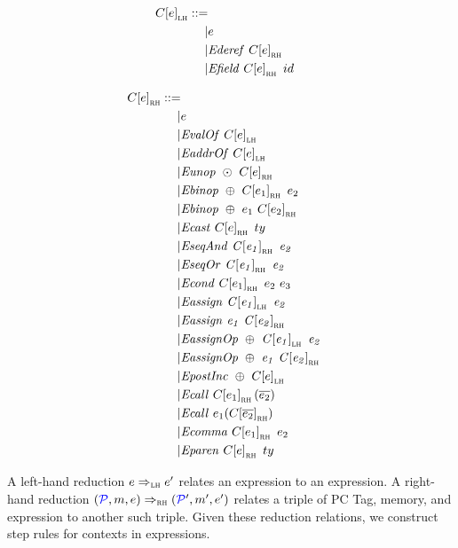 \documentclass{llncs}
\begin{document}
\[\begin{aligned}
\ctx{\expr}_\lh ::= \\
| & \expr & \\ %
| & \deref{\ctx{\expr}_\rh} \\ %
| & \field{\ctx{\expr}_\rh}{id} \\ %
\end{aligned}\]

\[\begin{aligned}
\ctx{\expr}_\rh ::= \\
| & \expr & \\ %
| & \valof{\ctx{\expr}_\lh} \\ %
| & \addrof{\ctx{\expr}_\lh} \\ %
| & \unop{\odot}{\ctx{\expr}_\rh} \\ %
| & \binop{\oplus}{\ctx{\expr_1}_\rh}{\expr_2} \\ %
| & \binop{\oplus}{\expr_1}{\ctx{\expr_2}_\rh} \\ %
| & \cast{\ctx{\expr}_\rh}{\type} \\ %
| & \seqand{\ctx{\expr_1}_\rh}{\expr_2} \\ %
| & \seqor{\ctx{\expr_1}_\rh}{\expr_2} \\ %
| & \condition{\ctx{\expr_1}_\rh}{\expr_2}{\expr_3} \\ %
| & \assign{\ctx{\expr_1}_\lh}{\expr_2} \\ %
| & \assign{\expr_1}{\ctx{\expr_2}_\rh} \\ %
| & \assignop{\oplus}{\ctx{\expr_1}_\lh}{\expr_2} \\ %
| & \assignop{\oplus}{\expr_1}{\ctx{\expr_2}_\rh} \\ %
| & \postinc{\oplus}{\ctx{\expr}_\lh} \\ %
| & \call{\ctx{\expr_1}_\rh}{\overline{\expr_2}} \\ %
| & \call{\expr_1}{\ctx{\overline{\expr_2}}_\rh} \\ %
| & \comma{\ctx{\expr_1}_\rh}{\expr_2} \\ %
| & \paren{\ctx{\expr}_\rh}{\type}{} \\ %
\end{aligned}\]

A left-hand reduction \(e \Rightarrow_{\textnormal{\sc lh}} e'\)
relates an expression to an expression. A right-hand reduction
\((\mathcal{\color{blue} P\mathit{}},m,e) \Rightarrow_{\textnormal{\sc rh}} (\mathcal{\color{blue} P\mathit{}}',m',e')\)
relates a triple of PC Tag, memory, and expression to another such triple.
Given these reduction relations, we construct step rules for contexts in
expressions.
\end{document}
